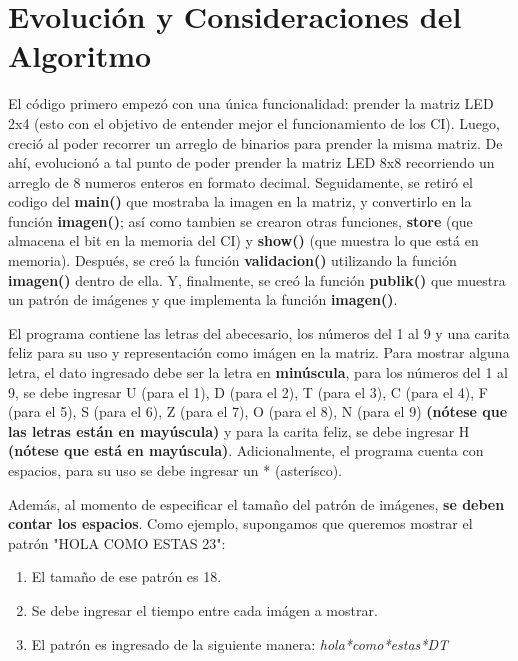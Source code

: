 \documentclass{article}
\begin{document}
\section{Evolución y Consideraciones del Algoritmo}
El código primero empezó con una única funcionalidad: prender la matriz LED 2x4 (esto con el objetivo de entender mejor el funcionamiento de los CI). Luego, creció al poder recorrer un arreglo de binarios para prender la misma matriz. De ahí, evolucionó a tal punto de poder prender la matriz LED 8x8 recorriendo un arreglo de 8 numeros enteros en formato decimal. Seguidamente, se retiró el codigo del \textbf{main()} que mostraba la imagen en la matriz, y convertirlo en la función \textbf{imagen()}; así como tambien se crearon otras funciones, \textbf{store} (que almacena el bit en la memoria del CI) y \textbf{show()} (que muestra lo que está en memoria). Después, se creó la función \textbf{validacion()} utilizando la función \textbf{imagen()} dentro de ella. Y, finalmente, se creó la función \textbf{publik()} que muestra un patrón de imágenes y que implementa la función \textbf{imagen()}.
\par El programa contiene las letras del abecesario, los números del 1 al 9 y una carita feliz para su uso y representación como imágen en la matriz. Para mostrar alguna letra, el dato ingresado debe ser la letra en \textbf{minúscula}, para los números del 1 al 9, se debe ingresar U (para el 1), D (para el 2), T (para el 3), C (para el 4), F (para el 5), S (para el 6), Z (para el 7), O (para el 8), N (para el 9) \textbf{(nótese que las letras están en mayúscula)} y para la carita feliz, se debe ingresar H \textbf{(nótese que está en mayúscula)}. Adicionalmente, el programa cuenta con espacios, para su uso se debe ingresar un * (asterísco).
\par Además, al momento de especificar el tamaño del patrón de imágenes, \textbf{se deben contar los espacios}. Como ejemplo, supongamos que queremos mostrar el patrón "HOLA COMO ESTAS 23":

\begin{enumerate}
    \item El tamaño de ese patrón es 18.
    \item Se debe ingresar el tiempo entre cada imágen a mostrar.
    \item El patrón es ingresado de la siguiente manera: \emph{hola*como*estas*DT}
\end{enumerate}



\end{document}
